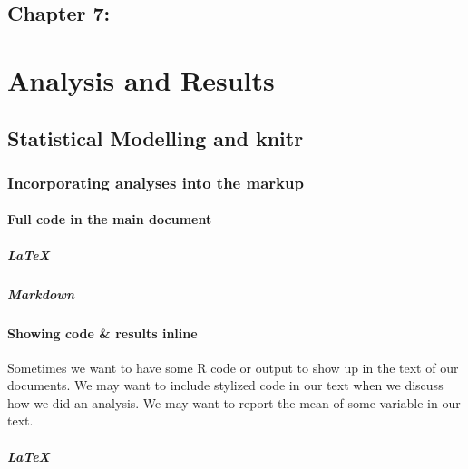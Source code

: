 \documentclass[ChapterTOCs,krantz1]{krantz}\usepackage{graphicx, color}
\begin{document}
\chapter{Chapter 7:}



\part{Analysis and Results}





\chapter{Statistical Modelling and knitr} \label{StatsModel}

\section{Incorporating analyses into the markup}

\subsection{Full code in the main document}

\subsubsection{\LaTeX  }

\subsubsection{Markdown}

\subsection{Showing code \& results inline}

Sometimes we want to have some R code or output to show up in the text of our documents. We may want to include stylized code in our text when we discuss how we did an analysis. We may want to report the mean of some variable in our text.

\subsubsection{LaTeX}
\end{document}
